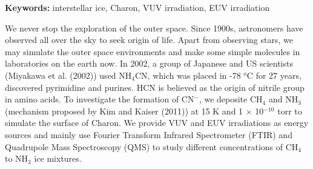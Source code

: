 \begin{abstracten}

{\bf \sf Keywords:} interstellar ice, Charon, VUV irradiation, EUV irradiation

\vspace{2em}

We never stop the exploration of the outer space. Since 1900s, astronomers have observed all over the sky to seek origin of life. Apart from observing stars, we may simulate the outer space environments and make some simple molecules in laboratories on the earth now. In 2002, a group of Japanese and US scientists (Miyakawa et al. (2002)\cite{miyakawa2002cold}) used NH$_4$CN, which was placed in -78 $^o$C for 27 years, discovered pyrimidine and purines. HCN is believed as the origin of nitrile group in amino acids. To investigate the formation of CN$^-$, we deposite CH$_4$ and NH$_3$ (mechanism proposed by Kim and Kaiser (2011)\cite{kim}) at 15 K and 1 $\times$ 10$^{-10}$ torr to simulate the surface of Charon. We provide VUV and EUV irradiations as energy sources and mainly use Fourier Transform Infrared Spectrometer (FTIR) and Quadrupole Mass Spectroscopy (QMS) to study different concentrations of CH$_4$ to NH$_3$ ice mixtures.

\end{abstracten} 

